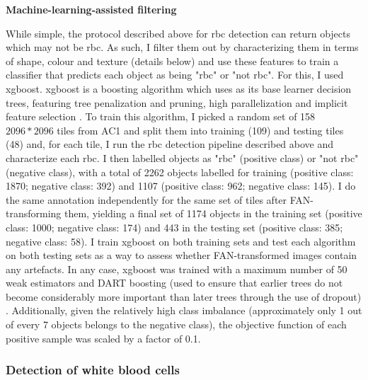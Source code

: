 \noindent \textbf{Machine-learning-assisted filtering}

While simple, the protocol described above for \ac{rbc} detection can return objects which may not be \ac{rbc}. As such, I filter them out by characterizing them in terms of shape, colour and texture (details below) and use these features to train a classifier that predicts each object as being "\ac{rbc}" or "not \ac{rbc}". For this, I used \ac{xgboost}. \ac{xgboost} is a boosting algorithm which uses as its base learner decision trees, featuring tree penalization and pruning, high parallelization and implicit feature selection \cite{Chen2016-xk}. To train this algorithm, I picked a random set of 158 $2096*2096$ tiles from AC1 and split them into training (109) and testing tiles (48) and, for each tile, I run the \ac{rbc} detection pipeline described above and characterize each \ac{rbc}. I then labelled objects as "\ac{rbc}" (positive class) or "not \ac{rbc}" (negative class), with a total of 2262 objects labelled for training (positive class: 1870; negative class: 392) and 1107 (positive class: 962; negative class: 145). I do the same annotation independently for the same set of tiles after FAN-transforming them, yielding a final set of 1174 objects in the training set (positive class: 1000; negative class: 174) and 443 in the testing set (positive class: 385; negative class: 58). I train \ac{xgboost} on both training sets and test each algorithm on both testing sets as a way to assess whether FAN-transformed images contain any artefacts. In any case, \ac{xgboost} was trained with a maximum number of 50 weak estimators and DART boosting (used to ensure that earlier trees do not become considerably more important than later trees through the use of dropout) \cite{Rashmi2015-qe}. Additionally, given the relatively high class imbalance (approximately only 1 out of every 7 objects belongs to the negative class), the objective function of each positive sample was scaled by a factor of 0.1.

\subsubsection{Detection of white blood cells}


